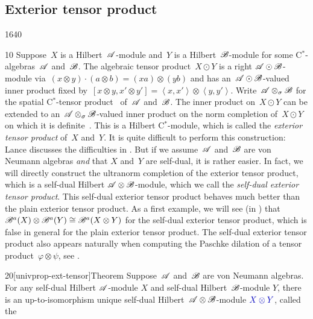 \subsection{Exterior tensor product}
\begin{parsec}{1640}%
\begin{point}{10}%
Suppose~$X$ is a Hilbert~$\mathscr{A}$-module
    and~$Y$ is a Hilbert~$\mathscr{B}$-module
    for some C$^*$-algebras~$\mathscr{A}$ and~$\mathscr{B}$.
The algebraic tensor product~$X \odot Y$
    is a right $\mathscr{A} \odot \mathscr{B}$-module
    via~$(x\otimes y)\cdot (a\otimes b) = (xa) \otimes (yb)$
    and has an~$\mathscr{A} \odot \mathscr{B}$-valued inner
    product fixed by~$[x\otimes y, x'\otimes y']
        = \left<x,x'\right> \otimes \left<y,y'\right>$.
Write~$\mathscr{A} \otimes_\sigma \mathscr{B}$ for the spatial
    C$^*$-tensor product~\cite[\S11.3]{kr} of~$\mathscr{A}$ and~$\mathscr{B}$.
The inner product on~$X \odot Y$ can be extended
    to an~$\mathscr{A} \otimes_\sigma \mathscr{B}$-valued inner product
    on the norm completion of~$X \odot Y$
    on which it is definite~\cite{lance}.
This is a Hilbert C$^*$-module,
    which is called the \emph{exterior tensor product} of~$X$ and~$Y$.
It is quite difficult to perform this construction:
    Lance discusses the difficulties in \cite[Ch.~4]{lance}.
But if we assume~$\mathscr{A}$ and~$\mathscr{B}$ are von Neumann algebras
    \emph{and} that $X$ and~$Y$ are self-dual,
    it is rather easier.
In fact, we will directly construct the ultranorm completion
    of the exterior tensor product,
    which is a self-dual Hilbert $\mathscr{A} \otimes \mathscr{B}$-module,
    which we call the \emph{self-dual exterior tensor product}.
This self-dual exterior tensor product
    behaves much better than the plain exterior tensor product.
    As a first example, we will see (in )
    that~$\mathscr{B}^a(X) \otimes \mathscr{B}^a(Y) \cong \mathscr{B}^a(X\otimes Y)$
        for the self-dual exterior tensor product,
        which is false in general for the plain exterior tensor product.
The self-dual exterior tensor product also appears naturally
    when computing the Paschke dilation
    of a tensor product~$\varphi \otimes \psi$, see .
\end{point}
\begin{point}{20}[univprop-ext-tensor]{Theorem}%
Suppose~$\mathscr{A}$ and~$\mathscr{B}$ are von Neumann algebras.
For any self-dual Hilbert $\mathscr{A}$-module $X$
    and self-dual Hilbert~$\mathscr{B}$-module $Y$,
    there is an up-to-isomorphism unique
    self-dual Hilbert~$\mathscr{A}\otimes \mathscr{B}$-module
    $\Define{X \otimes Y}$, called the %

\end{point}
\end{parsec}
